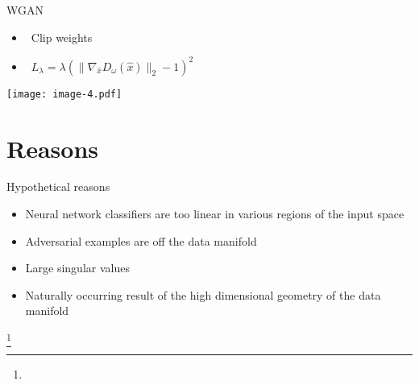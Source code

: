 \documentclass[14pt,mathserif,aspectratio=43,unicode]{beamer}
\newcommand\articlenote[1]{%
  \begingroup%
  \renewcommand\thefootnote{}\footnote{#1}%
  \addtocounter{footnote}{-1}%
  \endgroup%
}
\begin{document}
\begin{frame}{WGAN}

    \begin{itemize}
    
        \item {}~Clip weights
        \pause
        \item {}~$L_\lambda = \lambda(\|\nabla_{\hat{x}}D_\omega(\hat{x})\|_2 - 1)^2$
    \end{itemize}
    
    \begin{center}
        \texttt{[image: image-4.pdf]}
    \end{center}
    
\end{frame}



\section{Reasons}

\begin{frame}{Hypothetical reasons}

    \begin{itemize}
        \item Neural network classifiers are too linear in
various regions of the input space
        \item Adversarial examples are off the data manifold
        \item Large singular values
        \item Naturally occurring result of the high dimensional geometry of the data manifold
    \end{itemize}
    
    \articlenote{}

\end{frame}
\end{document}
